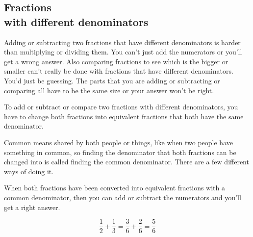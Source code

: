 \documentclass[16pt]{article}
\begin{document}
\begin{spacing}{1.25}
\pagebreak

\section{Fractions\\with different denominators}
Adding or subtracting two fractions that have different denominators is harder than multiplying or dividing them. You can't just add the numerators or you'll get a wrong answer. Also comparing fractions to see which is the bigger or smaller can’t really be done with fractions that have different denominators. You’d just be guessing. The parts that you are adding or subtracting or comparing all have to be the same size or your answer won’t be right.

To add or subtract or compare two fractions with different denominators, you have to change both fractions into equivalent fractions that both have the same denominator.

Common means shared by both people or things, like when two people have something in common, so finding the denominator that both fractions can be changed into is called finding the common denominator. There are a few different ways of doing it.

When both fractions have been converted into equivalent fractions with a common denominator, then you can add or subtract the numerators and you’ll get a right answer.\\


$$\frac{1}{2} + \frac{1}{3} = \frac{3}{6} + \frac{2}{6} = \frac{5}{6}$$


\end{spacing}
\end{document}
